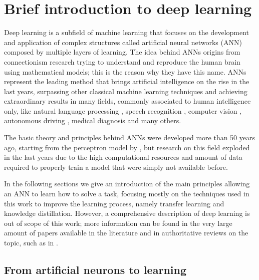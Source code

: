 \chapter{Brief introduction to deep learning}\label{sec:deep_learning}
Deep learning is a subfield of machine learning that focuses on the development and application of complex structures called artificial neural networks (ANN) composed by multiple layers of learning.
The idea behind ANNs origins from connectionism research trying to understand and reproduce the human brain using mathematical models; this is the reason why they have this name.
ANNs represent the leading method that brings artificial intelligence on the rise in the last years, surpassing other classical machine learning techniques and achieving extraordinary results in many fields, commonly associated to human intelligence only, like natural language processing \cite{bengio2000neural}, speech recognition \cite{hinton2012deep}, computer vision \cite{krizhevsky2012imagenet}, autonomous driving \cite{grigorescu2020survey}, medical diagnosis \cite{gulshan2016development} and many others.

The basic theory and principles behind ANNs were developed more than 50 years ago, starting from the perceptron model by \citeauthor{rosenblatt1958perceptron} \cite{rosenblatt1958perceptron}, but research on this field exploded in the last years due to the high computational resources and amount of data required to properly train a model that were simply not available before.

In the following sections we give an introduction of the main principles allowing an ANN to learn how to solve a task, focusing mostly on the techniques used in this work to improve the learning process, namely transfer learning and knowledge distillation.
However, a comprehensive description of deep learning is out of scope of this work; more information can be found in the very large amount of papers available in the literature and in authoritative reviews on the topic, such as in \cite{lecun2015deep}.


\section{From artificial neurons to learning}
